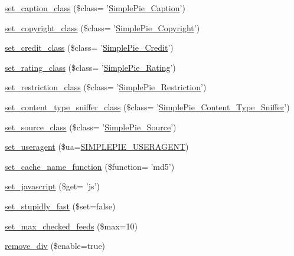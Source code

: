\begin{DoxyCompactItemize}
\hyperlink{class_simple_pie_aad63449d06d78c35b3186ab4d79bf1f0}{set\-\_\-caption\-\_\-class} (\$class= '\hyperlink{class_simple_pie___caption}{Simple\-Pie\-\_\-\-Caption}')
\item 
\hyperlink{class_simple_pie_a2c9a1a9693468f15b59fed6bf5933c38}{set\-\_\-copyright\-\_\-class} (\$class= '\hyperlink{class_simple_pie___copyright}{Simple\-Pie\-\_\-\-Copyright}')
\item 
\hyperlink{class_simple_pie_a79121ea271cb066ea33d3607bbf91e16}{set\-\_\-credit\-\_\-class} (\$class= '\hyperlink{class_simple_pie___credit}{Simple\-Pie\-\_\-\-Credit}')
\item 
\hyperlink{class_simple_pie_a3aec7bcfe84288982cd784ccc98a9b4d}{set\-\_\-rating\-\_\-class} (\$class= '\hyperlink{class_simple_pie___rating}{Simple\-Pie\-\_\-\-Rating}')
\item 
\hyperlink{class_simple_pie_adee7d90c088f88a9300728f6c503888a}{set\-\_\-restriction\-\_\-class} (\$class= '\hyperlink{class_simple_pie___restriction}{Simple\-Pie\-\_\-\-Restriction}')
\item 
\hyperlink{class_simple_pie_a6f3560b8880d714c2d35b0fcfc359ab4}{set\-\_\-content\-\_\-type\-\_\-sniffer\-\_\-class} (\$class= '\hyperlink{class_simple_pie___content___type___sniffer}{Simple\-Pie\-\_\-\-Content\-\_\-\-Type\-\_\-\-Sniffer}')
\item 
\hyperlink{class_simple_pie_a4d8e098048348c6967543cb92c68703f}{set\-\_\-source\-\_\-class} (\$class= '\hyperlink{class_simple_pie___source}{Simple\-Pie\-\_\-\-Source}')
\item 
\hyperlink{class_simple_pie_a383b3bff5c05ac2c5cfcfe2c888ad6d7}{set\-\_\-useragent} (\$ua=\hyperlink{simplepie_8inc_aa16b1a92eba4943f883b1f958edba8ef}{S\-I\-M\-P\-L\-E\-P\-I\-E\-\_\-\-U\-S\-E\-R\-A\-G\-E\-N\-T})
\item 
\hyperlink{class_simple_pie_aa1641352593aebc2f3454067d1f5269d}{set\-\_\-cache\-\_\-name\-\_\-function} (\$function= 'md5')
\item 
\hyperlink{class_simple_pie_ad712308940589a1edfa7baf1350f9a80}{set\-\_\-javascript} (\$get= 'js')
\item 
\hyperlink{class_simple_pie_a6dcf1759d29d47e4f9f987c6c6269d17}{set\-\_\-stupidly\-\_\-fast} (\$set=false)
\item 
\hyperlink{class_simple_pie_a8a98d9cff10a60276960c9b175a3e1f9}{set\-\_\-max\-\_\-checked\-\_\-feeds} (\$max=10)
\item 
\hyperlink{class_simple_pie_a23ab8850e9f9e07562ee8f48262e7ad5}{remove\-\_\-div} (\$enable=true)
\item 

\end{DoxyCompactItemize}
